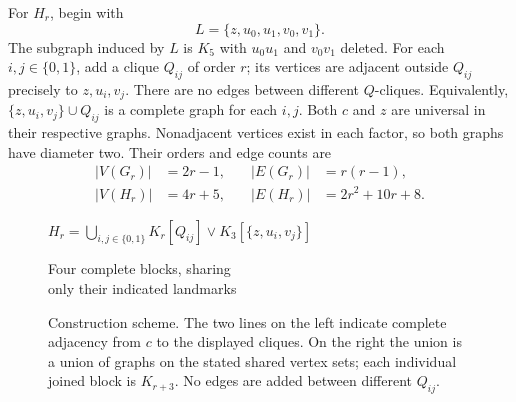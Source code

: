 \documentclass[11pt]{article}
\theoremstyle{definition}
\theoremstyle{remark}
\newcommand{\card}[1]{\lvert #1\rvert}
\begin{document}
For $H_r$, begin with
\[
 L=\{z,u_0,u_1,v_0,v_1\}.
\]
The subgraph induced by $L$ is $K_5$ with $u_0u_1$ and $v_0v_1$ deleted.
For each $i,j\in\{0,1\}$, add a clique $Q_{ij}$ of order $r$; its vertices
are adjacent outside $Q_{ij}$ precisely to $z,u_i,v_j$. There are no edges
between different $Q$-cliques. Equivalently,
$\{z,u_i,v_j\}\cup Q_{ij}$ is a complete graph for each $i,j$.
Both $c$ and $z$ are universal in their respective graphs. Nonadjacent
vertices exist in each factor, so both graphs have diameter two. Their
orders and edge counts are
\begin{equation}\label{eq:sizes}
 \begin{aligned}
 \card{V(G_r)}&=2r-1,&\quad \card{E(G_r)}&=r(r-1),\\
 \card{V(H_r)}&=4r+5,&\quad \card{E(H_r)}&=2r^2+10r+8.
 \end{aligned}
\end{equation}

\begin{figure}[htbp]
\centering
\begin{minipage}{.36\textwidth}
\centering
{}
\end{minipage}\hfill
\begin{minipage}{.59\textwidth}
\centering
$\displaystyle
 H_r=\bigcup_{i,j\in\{0,1\}}K_r[Q_{ij}]\vee K_3[\{z,u_i,v_j\}]$
\par\medskip
Four complete blocks, sharing\\only their indicated landmarks
\end{minipage}
\caption{Construction scheme. The two lines on the left indicate complete
adjacency from $c$ to the displayed cliques. On the right the union is a union
of graphs on the stated shared vertex sets; each individual joined block is
$K_{r+3}$. No edges are added between different $Q_{ij}$.}
\label{fig:scheme}
\end{figure}
\end{document}
